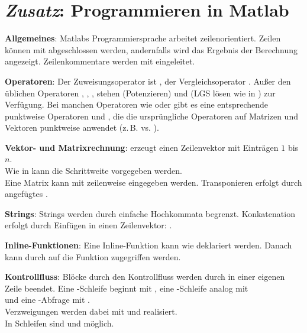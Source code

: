 \section{%
    \emph{Zusatz}: Programmieren in Matlab%
}

\textbf{Allgemeines}:
Matlabs Programmiersprache arbeitet zeilenorientiert.
Zeilen können mit \code{;} abgeschlossen werden, andernfalls wird das
Ergebnis der Berechnung angezeigt.
Zeilenkommentare werden mit \code{\%} eingeleitet.

\textbf{Operatoren}:
Der Zuweisungsoperator ist \code{=}, der Vergleichsoperator \code{==}.
Außer den üblichen Operatoren \code{+}, \code{-}, \code{*}, \code{/} stehen
\code{^} (Potenzieren) und \code{\\} (LGS lösen wie in )
zur Verfügung.
Bei manchen Operatoren wie \code{*} oder \code{^} gibt es eine entsprechende
punktweise Operatoren  und , die die ursprüngliche Operatoren
auf Matrizen und Vektoren punktweise anwendet (z.\,B.  vs.
).

\textbf{Vektor- und Matrixrechnung}:
 erzeugt einen Zeilenvektor mit Einträgen $1$ bis $n$. \\
Wie in  kann die Schrittweite vorgegeben werden. \\
Eine Matrix kann mit \code{[a1, a2, a3; a4, a5, a6]} zeilenweise eingegeben
werden.
Transponieren erfolgt durch angefügtes .

\textbf{Strings}:
Strings werden durch einfache Hochkommata  begrenzt.
Konkatenation erfolgt durch Einfügen in einen Zeilenvektor:
.

\textbf{Inline-Funktionen}:
Eine Inline-Funktion kann wie  deklariert werden.
Danach kann durch  auf die Funktion zugegriffen werden.

\textbf{Kontrollfluss}:
Blöcke durch den Kontrollfluss werden durch  in einer eigenen
Zeile beendet.
Eine -Schleife beginnt mit ,
eine -Schleife analog mit \\
 und
eine -Abfrage mit . \\
Verzweigungen werden dabei mit  und 
realisiert. \\
In Schleifen sind  und  möglich.

